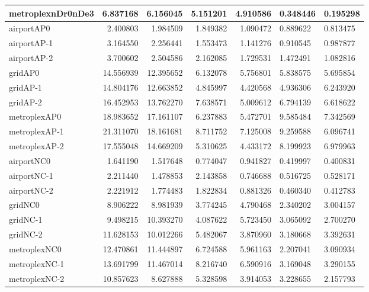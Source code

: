 \begin{longtable}{|l|r|r|r|r|}
metroplexnDr0nDe3 & 6.837168 & 6.156045 & 5.151201 & 4.910586 & 0.348446 & 0.195298 \\ \hline
airportAP0 & 2.400803 & 1.984509 & 1.849382 & 1.090472 & 0.889622 & 0.813475 \\ \hline
airportAP-1 & 3.164550 & 2.256441 & 1.553473 & 1.141276 & 0.910545 & 0.987877 \\ \hline
airportAP-2 & 3.700602 & 2.504586 & 2.162085 & 1.729531 & 1.472491 & 1.082816 \\ \hline
gridAP0 & 14.556939 & 12.395652 & 6.132078 & 5.756801 & 5.838575 & 5.695854 \\ \hline
gridAP-1 & 14.804176 & 12.663852 & 4.845997 & 4.420568 & 4.936306 & 6.243920 \\ \hline
gridAP-2 & 16.452953 & 13.762270 & 7.638571 & 5.009612 & 6.794139 & 6.618622 \\ \hline
metroplexAP0 & 18.983652 & 17.161107 & 6.237883 & 5.472701 & 9.585484 & 7.342569 \\ \hline
metroplexAP-1 & 21.311070 & 18.161681 & 8.711752 & 7.125008 & 9.259588 & 6.096741 \\ \hline
metroplexAP-2 & 17.555048 & 14.669209 & 5.310625 & 4.433172 & 8.199923 & 6.979963 \\ \hline
airportNC0 & 1.641190 & 1.517648 & 0.774047 & 0.941827 & 0.419997 & 0.400831 \\ \hline
airportNC-1 & 2.211440 & 1.478853 & 2.143858 & 0.746688 & 0.516725 & 0.528171 \\ \hline
airportNC-2 & 2.221912 & 1.774483 & 1.822834 & 0.881326 & 0.460340 & 0.412783 \\ \hline
gridNC0 & 8.906222 & 8.981939 & 3.774245 & 4.790468 & 2.340202 & 3.004157 \\ \hline
gridNC-1 & 9.498215 & 10.393270 & 4.087622 & 5.723450 & 3.065092 & 2.700270 \\ \hline
gridNC-2 & 11.628153 & 10.012266 & 5.482067 & 3.870960 & 3.180668 & 3.392631 \\ \hline
metroplexNC0 & 12.470861 & 11.444897 & 6.724588 & 5.961163 & 2.207041 & 3.090934 \\ \hline
metroplexNC-1 & 13.691799 & 11.467014 & 8.216740 & 6.590916 & 3.169048 & 3.290155 \\ \hline
metroplexNC-2 & 10.857623 & 8.627888 & 5.328598 & 3.914053 & 3.228655 & 2.157793 \\ \hline
\end{longtable}
